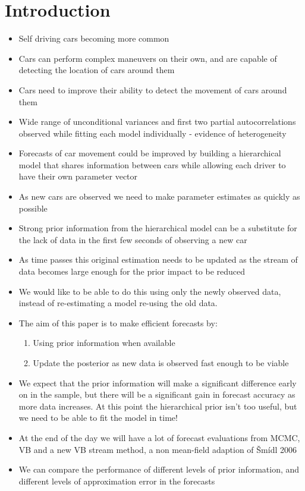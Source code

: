\documentclass[12pt,a4paper]{article}\usepackage[]{graphicx}\usepackage[]{color}
\begin{document}
\section{Introduction}

\begin{itemize}
\item Self driving cars becoming more common
\item Cars can perform complex maneuvers on their own, and are capable of detecting the location of cars around them
\item Cars need to improve their ability to detect the movement of cars around them
\item Wide range of unconditional variances and first two partial autocorrelations observed while fitting each model individually - evidence of heterogeneity
\item Forecasts of car movement could be improved by building a hierarchical model that shares information between cars while allowing each driver to have their own parameter vector
\item As new cars are observed we need to make parameter estimates as quickly as possible
\item Strong prior information from the hierarchical model can be a substitute for the lack of data in the first few seconds of observing a new car
\item As time passes this original estimation needs to be updated as the stream of data becomes large enough for the prior impact to be reduced
\item We would like to be able to do this using only the newly observed data, instead of re-estimating a model re-using the old data.
\item The aim of this paper is to make efficient forecasts by:
\begin{enumerate}
\item Using prior information when available
\item Update the posterior as new data is observed fast enough to be viable
\end{enumerate}
\item We expect that the prior information will make a significant difference early on in the sample, but there will be a significant gain in forecast accuracy as more data increases. At this point the hierarchical prior isn't too useful, but we need to be able to fit the model in time!
\item At the end of the day we will have a lot of forecast evaluations from MCMC, VB and a new VB stream method, a non mean-field adaption of {\v S}m{\'i}dl 2006
\item We can compare the performance of different levels of prior information, and different levels of approximation error in the forecasts
\end{itemize}
\end{document}
